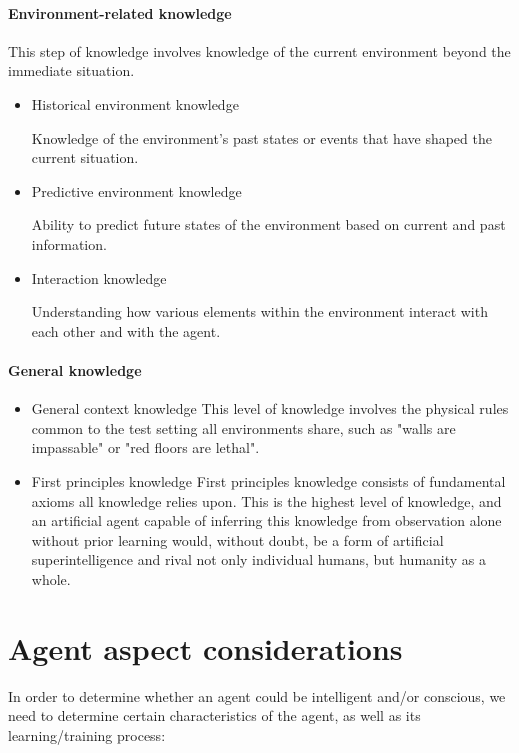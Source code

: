 \documentclass[masterthesis]{fer}
\begin{document}
\paragraph{Environment-related knowledge}

This step of knowledge involves knowledge of the current environment beyond the immediate situation.

\begin{itemize}

\item{Historical environment knowledge}

Knowledge of the environment's past states or events that have shaped the current situation.

\item{Predictive environment knowledge}

Ability to predict future states of the environment based on current and past information.

\item{Interaction knowledge}

Understanding how various elements within the environment interact with each other and with the agent.

\end{itemize}

\paragraph{General knowledge}

\begin{itemize}

\item{General context knowledge}
This level of knowledge involves the physical rules common to the test setting all environments share, such as "walls are impassable" or "red floors are lethal".

\item{First principles knowledge}
First principles knowledge consists of fundamental axioms all knowledge relies upon. This is the highest level of knowledge, and an artificial agent capable of inferring this knowledge from observation alone without prior learning would, without doubt, be a form of artificial superintelligence and rival not only individual humans, but humanity as a whole.

\end{itemize}

\section{Agent aspect considerations}
In order to determine whether an agent could be intelligent and/or conscious, we need to determine certain characteristics of the agent, as well as its learning/training process:
\end{document}
